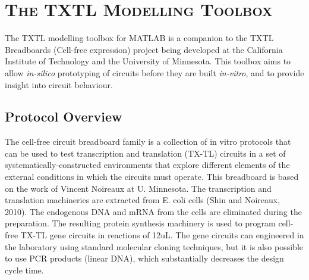 
\chapter{\textsc{The TXTL Modelling Toolbox}}

The TXTL modelling toolbox for MATLAB is a companion to the TXTL Breadboards (Cell-free expression) project being developed at the California Institute of Technology and the University of Minnesota. This toolbox aims to allow \textit{in-silico} prototyping of circuits before they are built \textit{in-vitro}, and to provide insight into circuit behaviour. 

\section{Protocol Overview}

The cell-free circuit breadboard family is a collection of in vitro
protocols that can be used to test transcription and translation
(TX-TL) circuits in a set of systematically-constructed environments
that explore different elements of the external conditions in which
the circuits must operate. This breadboard is based on the work of
Vincent Noireaux at U. Minnesota. The transcription and translation
machineries are extracted from E. coli cells (Shin and Noireaux,
2010). The endogenous DNA and mRNA from the cells are eliminated
during the preparation. The resulting protein synthesis machinery is
used to program cell-free TX-TL gene circuits in reactions of
12uL. The gene circuits can engineered in the laboratory using
standard molecular cloning techniques, but it is also possible to use
PCR products (linear DNA), which substantially decreases the design
cycle time. 

